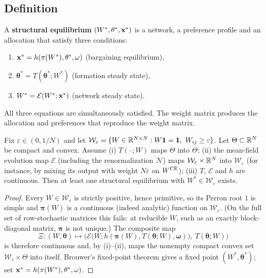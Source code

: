 \documentclass[../structural_economics_book.tex]{subfiles}
\begin{document}
\subsection{Definition}

\begin{definition}\label{ch13:def:structural_eq}
A \textbf{structural equilibrium} $(W^*, \theta^*, \mathbf{x}^*)$ is a network, a preference profile and an allocation that satisfy three conditions:
\begin{enumerate}
\item $\mathbf{x}^* = h(\pi(W^*), \theta^*, \omega)$ (bargaining equilibrium),
\item $\boldsymbol{\theta}^* = T(\boldsymbol{\theta}^*; W^*)$ (formation steady state),
\item $W^* = \mathcal{E}(W^*; \mathbf{x}^*)$ (network steady state).
\end{enumerate}
All three equations are simultaneously satisfied. The weight matrix produces the allocation and preferences that reproduce the weight matrix.
\end{definition}

\begin{theorem}\label{ch13:thm:existence}
Fix $\varepsilon \in (0, 1/N)$ and let $\mathcal{W}_\varepsilon = \{W \in \mathbb{R}^{N\times N} : W\mathbf{1} = \mathbf{1},\ W_{ij} \geq \varepsilon\}$. Let $\Theta \subset \mathbb{R}^N$ be compact and convex. Assume (i) $T(\cdot\,; W)$ maps $\Theta$ into $\Theta$; (ii) the mean-field evolution map $\mathcal{E}$ (including the renormalization $\mathcal{N}$) maps $\mathcal{W}_\varepsilon \times \mathbb{R}^N$ into $\mathcal{W}_\varepsilon$ (for instance, by mixing its output with weight $N\varepsilon$ on $W^{\text{CE}}$); (iii) $T$, $\mathcal{E}$ and $h$ are continuous. Then at least one structural equilibrium with $W^* \in \mathcal{W}_\varepsilon$ exists.
\end{theorem}

\begin{proof}
Every $W \in \mathcal{W}_\varepsilon$ is strictly positive, hence primitive, so its Perron root $1$ is simple and $\boldsymbol{\pi}(W)$ is a continuous (indeed analytic) function on $\mathcal{W}_\varepsilon$. (On the full set of row-stochastic matrices this fails: at reducible $W$, such as an exactly block-diagonal matrix, $\boldsymbol{\pi}$ is not unique.) The composite map
\[
\Xi: (W, \boldsymbol{\theta}) \mapsto \Big(\mathcal{E}\big(W; h(\boldsymbol{\pi}(W), T(\boldsymbol{\theta}; W), \boldsymbol{\omega})\big),\ T(\boldsymbol{\theta}; W)\Big)
\]
is therefore continuous and, by (i)--(ii), maps the nonempty compact convex set $\mathcal{W}_\varepsilon \times \Theta$ into itself. Brouwer's fixed-point theorem gives a fixed point $(W^*, \boldsymbol{\theta}^*)$; set $\mathbf{x}^* = h(\pi(W^*), \theta^*, \omega)$.
\end{proof}
\end{document}

